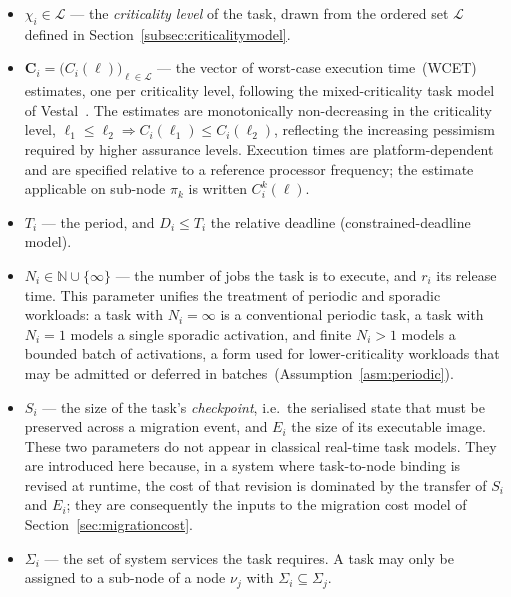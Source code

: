 \begin{itemize}
	\item $\chi_i \in \mathcal{L}$ --- the \emph{criticality level} of the
	task, drawn from the ordered set $\mathcal{L}$ defined in
	Section~\ref{subsec:criticalitymodel}.
	
	\item $\mathbf{C}_i = \bigl(C_i(\ell)\bigr)_{\ell \in \mathcal{L}}$ --- the
	vector of worst-case execution time~(WCET) estimates, one per criticality
	level, following the mixed-criticality task model of
	Vestal~\parencite{vestal2007}. The estimates are monotonically
	non-decreasing in the criticality level, $\ell_1 \leq \ell_2 \Rightarrow
	C_i(\ell_1) \leq C_i(\ell_2)$, reflecting the increasing pessimism
	required by higher assurance levels. Execution times are
	platform-dependent and are specified relative to a reference processor
	frequency; the estimate applicable on sub-node $\pi_k$ is written
	$C_i^{k}(\ell)$.
	
	\item $T_i$ --- the period, and $D_i \leq T_i$ the relative deadline
	(constrained-deadline model).
	
	\item $N_i \in \mathbb{N} \cup \{\infty\}$ --- the number of jobs the task
	is to execute, and $r_i$ its release time. This parameter unifies the
	treatment of periodic and sporadic workloads: a task with $N_i = \infty$
	is a conventional periodic task, a task with $N_i = 1$ models a
	single sporadic activation, and finite $N_i > 1$ models a bounded batch of
	activations, a form used for lower-criticality workloads that may be
	admitted or deferred in batches~(Assumption~\ref{asm:periodic}).
	
	\item $S_i$ --- the size of the task's \emph{checkpoint}, i.e.\ the
	serialised state that must be preserved across a migration event, and
	$E_i$ the size of its executable image. These two parameters do not
	appear in classical real-time task models. They are introduced here
	because, in a system where task-to-node binding is revised at runtime,
	the cost of that revision is dominated by the transfer of $S_i$ and
	$E_i$; they are consequently the inputs to the migration cost model of
	Section~\ref{sec:migrationcost}.
	
	\item $\Sigma_i$ --- the set of system services the task requires. A task
	may only be assigned to a sub-node of a node $\nu_j$ with
	$\Sigma_i \subseteq \Sigma_j$.
\end{itemize}

